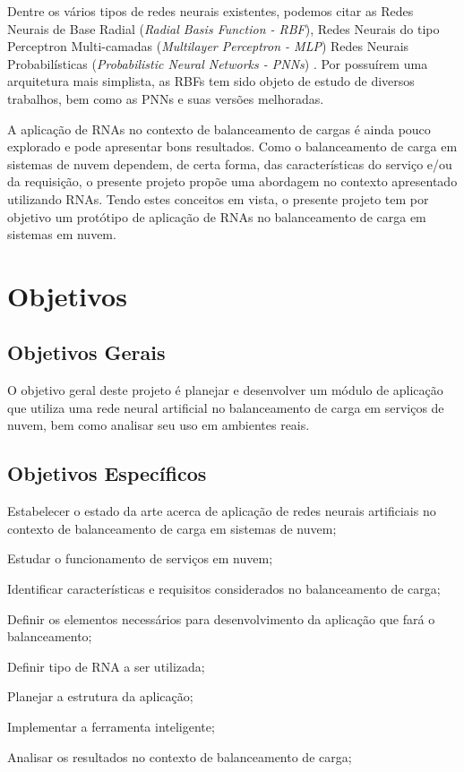Dentre os vários tipos de redes neurais existentes, podemos citar as Redes Neurais de Base Radial (\textit{Radial Basis Function - RBF}), Redes Neurais do tipo Perceptron Multi-camadas (\textit{Multilayer Perceptron - MLP}) Redes Neurais Probabilísticas (\textit{Probabilistic Neural Networks - PNNs}) \cite{specht1990} \cite{specht1992}. Por possuírem uma arquitetura mais simplista, as RBFs tem sido objeto de estudo de diversos trabalhos, bem como as PNNs e suas versões melhoradas. 

A aplicação de RNAs no contexto de balanceamento de cargas é ainda pouco explorado e pode apresentar bons resultados. Como o balanceamento de carga em sistemas de nuvem dependem, de certa forma, das características do serviço e/ou da requisição, o presente projeto propõe uma abordagem no contexto apresentado utilizando RNAs. Tendo estes conceitos em vista, o presente projeto tem por objetivo um protótipo de aplicação de RNAs no balanceamento de carga em sistemas em nuvem. 


\section{Objetivos}\label{cap:objetivos-justificativa}

\subsection{Objetivos Gerais}\label{sec:objetivos-gerais}

O objetivo geral deste projeto é planejar e desenvolver um módulo de aplicação que utiliza uma rede neural artificial no balanceamento de carga em serviços de nuvem, bem como analisar seu uso em ambientes reais.


\subsection{Objetivos Específicos}\label{sec:objetivos-especificos}

\begin{alineas}
	\item Estabelecer o estado da arte acerca de aplicação de redes neurais artificiais no contexto de balanceamento de carga em sistemas de nuvem;
	\item Estudar o funcionamento de serviços em nuvem;
	\item Identificar características e requisitos considerados no balanceamento de carga;
	\item Definir os elementos necessários para desenvolvimento da aplicação que fará o balanceamento;
	\item Definir tipo de RNA a ser utilizada;
	\item Planejar a estrutura da aplicação;
	\item Implementar a ferramenta inteligente;
	\item Analisar os resultados no contexto de balanceamento de carga;
\end{alineas}

